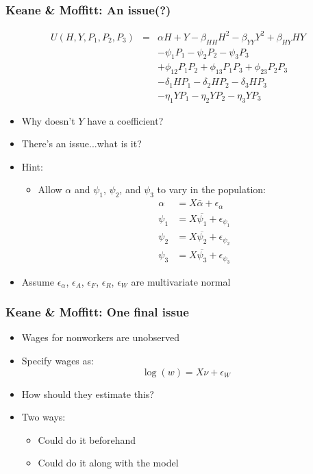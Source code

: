 \documentclass{beamer}
\begin{document}
\begin{frame}
\frametitle[alignment=center]{Keane \& Moffitt: An issue(?)}
$$\begin{array}{rcl}
U(H,Y,P_1,P_2,P_3) & = & \alpha H+Y-\beta_{HH}H^2-\beta_{YY}Y^2 +\beta_{HY}HY\\
 & & -\psi_1P_1-\psi_2P_2-\psi_3P_3 \\
 & & + \phi_{12}P_1P_2 + \phi_{13}P_1P_3+\phi_{23}P_2P_3 \\
 & & -\delta_1HP_1-\delta_2HP_2-\delta_3HP_3\\
 & & -\eta_1YP_1-\eta_2YP_2-\eta_3YP_3\end{array}$$
\begin{itemize}
\item Why doesn't $Y$ have a coefficient?
\item<2-> There's an issue...what is it?
\item<3-> Hint:
\begin{itemize}
\item<3-> Allow $\alpha$ and $\psi_1$, $\psi_2$, and $\psi_3$ to vary in the population:
\begin{align*}
\alpha & = X\bar{\alpha}+\epsilon_\alpha\\
\psi_1 & = X\overline{\psi_1}+\epsilon_{\psi_1}\\
\psi_2 & = X\overline{\psi_2}+\epsilon_{\psi_2}\\
\psi_3 & = X\overline{\psi_3}+\epsilon_{\psi_3}
\end{align*}
\end{itemize}
\item<3-> Assume $\epsilon_\alpha$, $\epsilon_A$, $\epsilon_F$, $\epsilon_R$, $\epsilon_W$ are multivariate normal 
\end{itemize}
\end{frame}

\begin{frame}
\frametitle[alignment=center]{Keane \& Moffitt: One final issue}
\begin{itemize}
\item Wages for nonworkers are unobserved
\item Specify wages as:
$$\log(w)=X\nu+\epsilon_W$$
\item How should they estimate this?
\bigskip
\item<2-> Two ways:
\bigskip
\begin{itemize}
\item Could do it beforehand
\bigskip
\item Could do it along with the model
\end{itemize} 
\end{itemize}
\end{frame}
\end{document}
